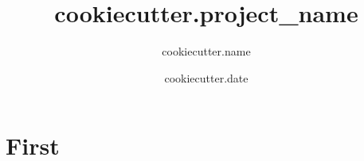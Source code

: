 \documentclass[12pt]{article}
\begin{document}
\title{ {{ cookiecutter.project_name }} }
\author{
  {{ cookiecutter.name }}
}
\date{ {{ cookiecutter.date }} }
\maketitle

\section{First}
\end{document}
